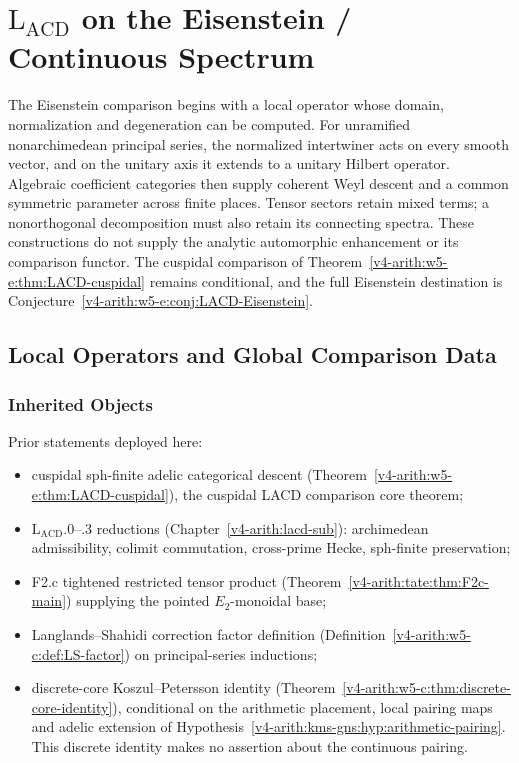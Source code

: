 \chapter{\(\mathrm{L}_{\mathrm{ACD}}\) on the Eisenstein / Continuous Spectrum}
\label{v4-arith:w6-d:chapter}

The Eisenstein comparison begins with a local operator whose domain,
normalization and degeneration can be computed. For unramified
nonarchimedean principal series, the normalized intertwiner acts on
every smooth vector, and on the unitary axis it extends to a unitary
Hilbert operator. Algebraic coefficient categories then supply coherent
Weyl descent and a common symmetric parameter across finite places.
Tensor sectors retain mixed terms; a nonorthogonal decomposition must
also retain its connecting spectra. These constructions do not supply
the analytic automorphic enhancement or its comparison functor.
The cuspidal comparison of
Theorem~\ref{v4-arith:w5-e:thm:LACD-cuspidal} remains conditional,
and the full Eisenstein destination is
Conjecture~\ref{v4-arith:w5-e:conj:LACD-Eisenstein}.

\section{Local Operators and Global Comparison Data}
\label{v4-arith:w6-d:domain}

\subsection{Inherited Objects}

Prior statements deployed here:
\begin{itemize}
\item cuspidal sph-finite adelic categorical descent
(Theorem~\ref{v4-arith:w5-e:thm:LACD-cuspidal}), the cuspidal LACD comparison core
theorem;
\item \(\mathrm{L}_{\mathrm{ACD}}.0\)--.3 reductions
(Chapter~\ref{v4-arith:lacd-sub}): archimedean admissibility,
colimit commutation, cross-prime Hecke, sph-finite preservation;
\item F2.c tightened restricted tensor product
(Theorem~\ref{v4-arith:tate:thm:F2c-main}) supplying the pointed
\(E_{2}\)-monoidal base;
\item Langlands--Shahidi correction factor definition
(Definition~\ref{v4-arith:w5-c:def:LS-factor}) on principal-series
inductions;
\item discrete-core Koszul--Petersson identity
(Theorem~\ref{v4-arith:w5-c:thm:discrete-core-identity}), conditional
on the arithmetic placement, local pairing maps and adelic
extension of Hypothesis~\ref{v4-arith:kms-gns:hyp:arithmetic-pairing}.
This discrete identity makes no assertion about the continuous pairing.
\end{itemize}

